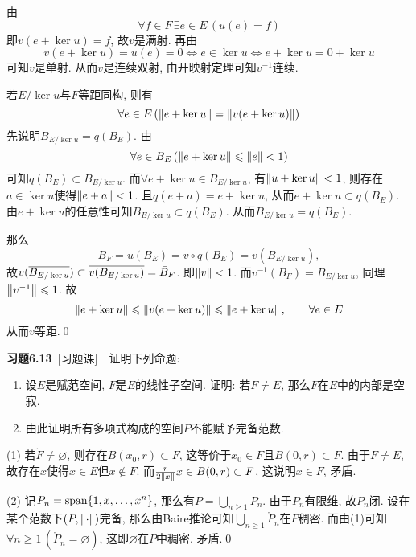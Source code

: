 \begin{Proof}
	由
	\[
	\forall f\in F\,\exists e\in E\,(u(e)=f)
	\]
	即$ v(e+\ker u)=f $, 故$ v $是满射. 再由
	\[
	v(e+\ker u)=u(e)=0\Longleftrightarrow e\in\ker u\Longleftrightarrow e+\ker u=0+\ker u
	\]
	可知$ v $是单射. 从而$ v $是连续双射, 由开映射定理可知$ v^{-1} $连续.
	
	若$ E/\ker u $与$ F $等距同构, 则有
	\[
	\forall e\in E\,(\norm{e+\ker u}=\norm{v(e+\ker u)})
	\]
	先说明$ B_{E/\ker u}=q(B_E) $. 由
	\[
	\forall e\in B_E\,(\norm{e+\ker u}\leqslant\norm{e}<1)
	\]
	可知$ q(B_E)\subset B_{E/\ker u} $. 而$ \forall e+\ker u\in B_{E/\ker u} $, 有$ \norm{u+\ker u}<1 $, 则存在$ a\in\ker u $使得$ \norm{e+a}<1 $. 且$ q(e+a)=e+\ker u $, 从而$ e+\ker u\subset q(B_E) $. 由$ e+\ker u $的任意性可知$ B_{E/\ker u}\subset q(B_E) $. 从而$ B_{E/\ker u}=q(B_E) $.
	
	那么
	\[
	B_F=u(B_E)=v\circ q(B_E)=v(B_{E/\ker u}),
	\]
	故$ v(\baro{B_{E/\ker u}})\subset\baro{v(B_{E/\ker u})}=\bar{B}_F $. 即$ \norm{v}<1 $. 而$ v^{-1}(B_F)=B_{E/\ker u} $, 同理$ \norm{v^{-1}}\leqslant 1 $. 故
	\[
	\norm{e+\ker u}\leqslant\norm{v(e+\ker u)}\leqslant\norm{e+\ker u},\qquad \forall e\in E
	\]
	从而$ v $等距.\qed
	\end{Proof}
	
	\textbf{习题6.13}\ [习题课]\ \ 证明下列命题:
	\begin{enumerate}[(1)]
	\item 设$ E $是赋范空间, $ F $是$ E $的线性子空间. 证明: 若$ F\ne E $, 那么$ F $在$ E $中的内部是空寂.
	\item 由此证明所有多项式构成的空间$ P $不能赋予完备范数.
	\end{enumerate}
	\begin{Proof}
	(1) 若$ \mathring{F}\ne\varnothing $, 则存在$ B(x_0,r)\subset F $, 这等价于$ x_0\in F $且$ B(0,r)\subset F $. 由于$ F\ne E $, 故存在$ x $使得$ x\in E $但$ x\notin F $. 而$ \frac{r}{2\norm{x}}x\in B(0,r)\subset F $, 这说明$ x\in F $, 矛盾.
	
	(2) 记$ P_n=\Span\{ 1,x,\dots,x^n \} $, 那么有$ P=\bigcup_{n\geqslant 1}P_n $. 由于$ P_n $有限维, 故$ P_n $闭. 设在某个范数下$ (P,\norm{\cdot}) $完备, 那么由Baire推论可知$ \bigcup_{n\geqslant 1}\mathring{P}_n $在$ P $稠密. 而由(1)可知$ \forall n\geqslant 1\,(\mathring{P}_n=\varnothing) $, 这即$ \varnothing $在$ P $中稠密. 矛盾.\qed
	\end{Proof}